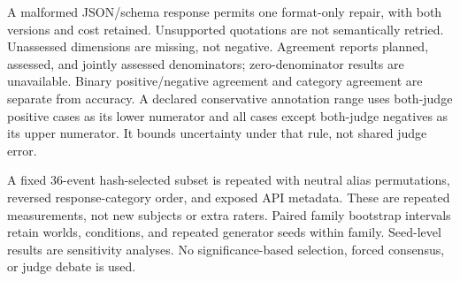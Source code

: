 A malformed JSON/schema response permits one format-only repair, with both versions and cost retained. Unsupported quotations are not semantically retried. Unassessed dimensions are missing, not negative. Agreement reports planned, assessed, and jointly assessed denominators; zero-denominator results are unavailable. Binary positive/negative agreement and category agreement are separate from accuracy. A declared conservative annotation range uses both-judge positive cases as its lower numerator and all cases except both-judge negatives as its upper numerator. It bounds uncertainty under that rule, not shared judge error.

A fixed 36-event hash-selected subset is repeated with neutral alias permutations, reversed response-category order, and exposed API metadata. These are repeated measurements, not new subjects or extra raters. Paired family bootstrap intervals retain worlds, conditions, and repeated generator seeds within family. Seed-level results are sensitivity analyses. No significance-based selection, forced consensus, or judge debate is used.
